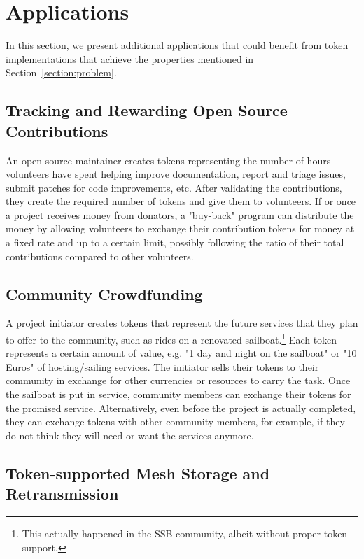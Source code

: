 \documentclass[sigplan,screen,10pt,review,anonymous]{acmart}
\begin{document}
\section{Applications}
\label{section:applications}

In this section, we present additional applications that could benefit from token implementations that achieve the properties mentioned in Section~\ref{section:problem}.

\subsection{Tracking and Rewarding Open Source Contributions}
\label{section:tracking-oss-contributions}

An open source maintainer creates tokens representing the number of hours volunteers have spent helping improve documentation, report and triage issues, submit patches for code improvements, etc. After validating the contributions, they create the required number of tokens and give them to volunteers. If or once a project receives money from donators, a "buy-back" program can distribute the money by allowing volunteers to exchange their contribution tokens for money at a fixed rate and up to a certain limit, possibly following the ratio of their total contributions compared to other volunteers.

\subsection{Community Crowdfunding}

A project initiator creates tokens that represent the future services that they plan to offer to the community, such as rides on a renovated sailboat.\footnote{This actually happened in the SSB community, albeit without proper token support.} Each token represents a certain amount of value, e.g. "1 day and night on the sailboat" or "10 Euros" of hosting/sailing services. The initiator sells their tokens to their community in exchange for other currencies or resources to carry the task. Once the sailboat is put in service, community members can exchange their tokens for the promised service. Alternatively, even before the project is actually completed, they can exchange tokens with other community members, for example, if they do not think they will need or want the services anymore.

\subsection{Token-supported Mesh Storage and Retransmission}
\end{document}
